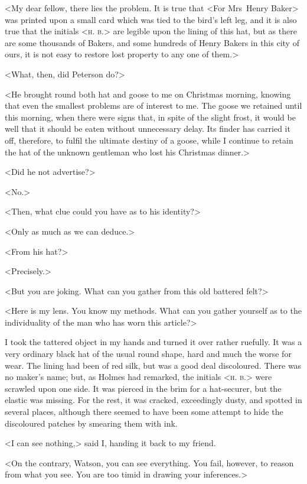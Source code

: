 <My dear fellow, there lies the problem. It is true that <For Mrs~Henry Baker> was printed upon a small card which was tied to the bird's left leg, and it is also true that the initials <\textsc{h. b.}> are legible upon the lining of this hat, but as there are some thousands of Bakers, and some hundreds of Henry Bakers in this city of ours, it is not easy to restore lost property to any one of them.>

<What, then, did Peterson do?>

<He brought round both hat and goose to me on Christmas morning, knowing that even the smallest problems are of interest to me. The goose we retained until this morning, when there were signs that, in spite of the slight frost, it would be well that it should be eaten without unnecessary delay. Its finder has carried it off, therefore, to fulfil the ultimate destiny of a goose, while I continue to retain the hat of the unknown gentleman who lost his Christmas dinner.>

<Did he not advertise?>

<No.>

<Then, what clue could you have as to his identity?>

<Only as much as we can deduce.>

<From his hat?>

<Precisely.>

<But you are joking. What can you gather from this old battered felt?>

<Here is my lens. You know my methods. What can you gather yourself as to the individuality of the man who has worn this article?>

I took the tattered object in my hands and turned it over rather ruefully. It was a very ordinary black hat of the usual round shape, hard and much the worse for wear. The lining had been of red silk, but was a good deal discoloured. There was no maker's name; but, as Holmes had remarked, the initials <\textsc{h. b.}> were scrawled upon one side. It was pierced in the brim for a hat-securer, but the elastic was missing. For the rest, it was cracked, exceedingly dusty, and spotted in several places, although there seemed to have been some attempt to hide the discoloured patches by smearing them with ink.

<I can see nothing,> said I, handing it back to my friend.

<On the contrary, Watson, you can see everything. You fail, however, to reason from what you see. You are too timid in drawing your inferences.>

